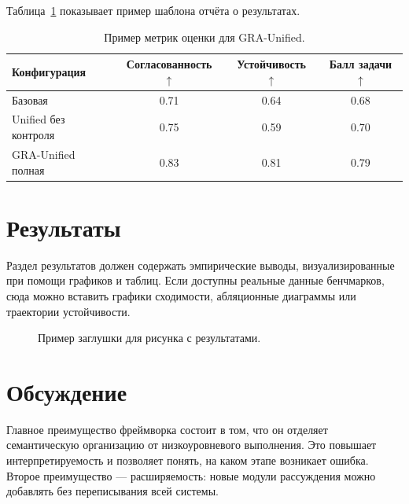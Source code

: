 \documentclass[11pt,a4paper]{article}
\begin{document}
Таблица~\ref{tab:metrics} показывает пример шаблона отчёта о результатах.

\begin{table}[H]
    \centering
    \caption{Пример метрик оценки для GRA-Unified.}
    \label{tab:metrics}
    \begin{tabular}{lccc}
        \toprule
        Конфигурация & Согласованность $\uparrow$ & Устойчивость $\uparrow$ & Балл задачи $\uparrow$ \\
        \midrule
        Базовая & 0.71 & 0.64 & 0.68 \\
        Unified без контроля & 0.75 & 0.59 & 0.70 \\
        GRA-Unified полная & 0.83 & 0.81 & 0.79 \\
        \bottomrule
    \end{tabular}
\end{table}

\section{Результаты}
Раздел результатов должен содержать эмпирические выводы, визуализированные при помощи графиков и таблиц. Если доступны реальные данные бенчмарков, сюда можно вставить графики сходимости, абляционные диаграммы или траектории устойчивости.

\begin{figure}[H]
    \centering
    \caption{Пример заглушки для рисунка с результатами.}
    \label{fig:results}
\end{figure}

\section{Обсуждение}
Главное преимущество фреймворка состоит в том, что он отделяет семантическую организацию от низкоуровневого выполнения. Это повышает интерпретируемость и позволяет понять, на каком этапе возникает ошибка. Второе преимущество — расширяемость: новые модули рассуждения можно добавлять без переписывания всей системы.
\end{document}
